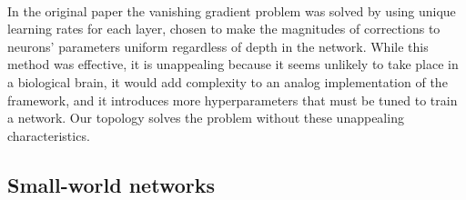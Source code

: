 \documentclass{article}
\newcommand{\npar}{\\\indent}
\begin{document}
\npar
In the original paper the vanishing gradient problem was solved by using unique learning rates for each layer, chosen to make the magnitudes of corrections to neurons' parameters uniform regardless of depth in the network. While this method was effective, it is unappealing because it seems unlikely to take place in a biological brain, it would add complexity to an analog implementation of the framework, and it introduces more hyperparameters that must be tuned to train a network. Our topology solves the problem without these unappealing characteristics.

\subsection{Small-world networks}
\label{sec:sw_background}
\end{document}
